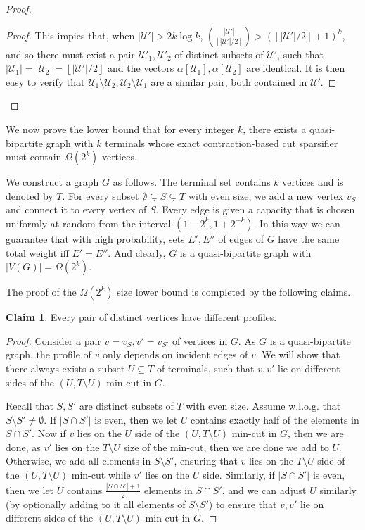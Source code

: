 \documentclass[11pt]{article}
\theoremstyle{definition}
\newtheorem{claim}[theorem]{Claim}
\newcommand{\uset}{{\mathcal U}}
\def\floor#1{\left\lfloor #1 \right\rfloor}
\def\card#1{\left| #1 \right|}
\newcounter{note}
\begin{document}
\begin{proof}
\begin{proof}
This impies that, when $|\uset'|>2k\log k$, $\binom{|\uset'|}{\floor{|\uset'|/2}}>(\floor{|\uset'|/2}+1)^k$, and so there must exist a pair $\mathcal{U}'_1,\mathcal{U}'_2$  of distinct subsets of $\mathcal{U}'$, such that $\card{\mathcal{U}_1} = \card{\mathcal{U}_2} = \floor{|\uset'|/2}$ and the vectors $\alpha[\uset_1],\alpha[\uset_2]$ are identical.
It is then easy to verify that $\uset_1\setminus \uset_2,\uset_2\setminus \uset_1$ are a similar pair, both contained in $\uset'$. 
\end{proof}
\end{proof}


We now prove the lower bound that for every integer $k$, there exists a quasi-bipartite graph with $k$ terminals whose exact contraction-based cut sparsifier must contain $\Omega(2^k)$ vertices.


We construct a graph $G$ as follows. The terminal set contains $k$ vertices and is denoted by $T$. For every subset $\emptyset\subsetneq S \subsetneq T$ with even size, we add a new vertex $v_S$ and connect it to every vertex of $S$.
Every edge is given a capacity that is chosen uniformly at random from the interval $(1-2^{k},1+2^{-k})$. In this way we can guarantee that with high probability, sets $E',E''$ of edges of $G$ have the same total weight iff $E'=E''$.
And clearly, $G$ is a quasi-bipartite graph with $|V(G)|=\Omega(2^k)$.

The proof of the $\Omega(2^k)$ size lower bound is completed by the following claims.

\begin{claim}
\label{clm: profiles}
Every pair of distinct vertices have different profiles.
\end{claim}
\begin{proof}
Consider a pair $v=v_S,v'=v_{S'}$ of vertices in $G$.
As $G$ is a quasi-bipartite graph, the profile of $v$ only depends on incident edges of $v$.
We will show that there always exists a subset $U\subseteq T$ of terminals, such that $v,v'$ lie on different sides of the $(U,T\setminus U)$ min-cut in $G$.

Recall that $S,S'$ are distinct subsets of $T$ with even size. Assume w.l.o.g. that $S\setminus S'\ne \emptyset$. If $|S\cap S'|$ is even, then we let $U$ contains exactly half of the elements in $S\cap S'$. Now if $v$ lies on the $U$ side of the $(U,T\setminus U)$ min-cut in $G$, then we are done, as $v'$ lies on the $T\setminus U$ size of the min-cut, then we are done we add to $U$. Otherwise, we add all elements in $S\setminus S'$, ensuring that $v$ lies on the $T\setminus U$ side of the $(U,T\setminus U)$ min-cut while $v'$ lies on the $U$ side.
Similarly, if $|S\cap S'|$ is even, then we let $U$ contains $\frac{|S\cap S'|+1}{2}$ elements in $S\cap S'$, and we can adjust $U$ similarly (by optionally adding to it all elements of $S\setminus S'$) to ensure that $v,v'$ lie on different sides of the $(U,T\setminus U)$ min-cut in $G$.
\end{proof}
\end{document}
